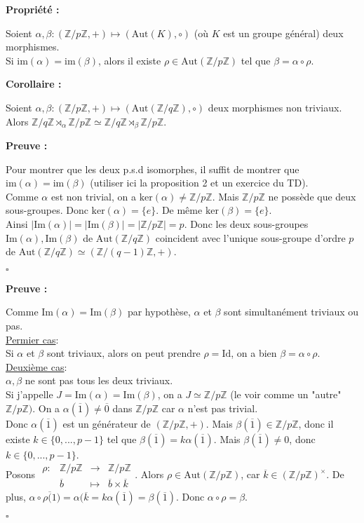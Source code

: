 \documentclass{report}
\renewenvironment{leftbar}{%
  \def\FrameCommand{\vrule width 0.4pt \hspace{10pt}}%
  \MakeFramed {\advance\hsize-\width \FrameRestore}}%
 {\endMakeFramed}%
\newenvironment{preuve}{\vspace*{0.5cm}
    \begin{leftbar}
    \noindent\textbf{Preuve :}\par}{
    \begin{flushright}
    $\square$
    \end{flushright}
    \end{leftbar}
}
\newenvironment{prop}{\begin{tcolorbox}[colframe= white]
    \textbf{Propriété :}
     \par}
    {\end{tcolorbox}}
\newenvironment{corollaire}{\begin{tcolorbox}[colframe= white]
    \textbf{Corollaire :} \par}
    {\end{tcolorbox}}
\newcommand{\im}[0]{\textrm{Im}}
\newcommand{\fonction}[5]{
    \begin{array}{l|rcl}
    #1: & #2 & \longrightarrow & #3 \\
        & #4 & \longmapsto & #5 
    \end{array}
}
\newcommand{\Z}{\mathbb{Z}}
\begin{document}
\begin{prop}
    Soient $\alpha,\beta : (\Z/p\Z,+) \mapsto (\mathrm{Aut}(K),\circ)$ (où $K$ est un groupe général) deux morphismes.\\
    Si $\mathrm{im}(\alpha) = \mathrm{im}(\beta)$, alors il existe $\rho\in\mathrm{Aut}(\Z/p\Z)$ tel que $\beta = \alpha\circ\rho$.
\end{prop}

\begin{corollaire}
    Soient $\alpha,\beta : (\Z/p\Z,+) \mapsto (\mathrm{Aut}(\Z/q\Z),\circ)$ deux morphismes non triviaux. \\
    Alors $\Z/q\Z \rtimes_\alpha \Z/p\Z \simeq \Z/q\Z \rtimes_\beta \Z/p\Z$.
\end{corollaire}

\begin{preuve}
    Pour montrer que les deux p.s.d isomorphes, il suffit de montrer que $\mathrm{im}(\alpha) = \mathrm{im}(\beta)$ (utiliser ici la proposition 2 et un exercice du TD).\\
    Comme $\alpha$ est non trivial, on a $\mathrm{ker}(\alpha) \neq \Z/p\Z$. Mais $\Z/p\Z$ ne possède que deux sous-groupes. Donc $\mathrm{ker}(\alpha) = \{e\}$. De même $\mathrm{ker}(\beta) = \{e\}$.\\
    Ainsi $|\im(\alpha)| = |\im(\beta)| = |\Z/p\Z| = p$. Donc les deux sous-groupes $\im(\alpha),\im(\beta)$ de $\mathrm{Aut}(\Z/q\Z)$ coincident avec l'unique sous-groupe d'ordre $p$ de $\mathrm{Aut}(\Z/q\Z) \simeq (\Z/(q-1)\Z,+)$.
\end{preuve}

\begin{preuve}
    Comme $\im(\alpha) = \im(\beta)$ par hypothèse, $\alpha$ et $\beta$ sont simultanément triviaux ou pas.\\
    \underline{Permier cas}:\\
    Si $\alpha$ et $\beta$ sont triviaux, alors on peut prendre $\rho = \mathrm{Id}$, on a bien $\beta = \alpha \circ \rho$.\\
    \underline{Deuxième cas}:\\
    $\alpha,\beta$ ne sont pas tous les deux triviaux.\\
    Si j'appelle $J = \im(\alpha) = \im(\beta)$, on a $J \simeq \Z/p\Z$ (le voir comme un "autre" $\Z/p\Z)$. On a $\alpha(\overline{1}) \neq \overline{0}$ dans $\Z/p\Z$ car $\alpha$ n'est pas trivial.\\
    Donc $\alpha(\overline{1})$ est un générateur de $(\Z/p\Z,+)$. Mais $\beta(\overline{1})\in \Z/p\Z$, donc il existe $k\in\{0,...,p-1\}$ tel que $\beta(\overline{1}) = k\alpha(\overline
    {1})$. Mais $\beta(\overline{1}) \neq 0$, donc $k\in\{0,...,p-1\}$.\\
    Posons $\fonction{\rho}{\Z/p\Z}{\Z/p\Z}{\overline{b}}{\overline{b}\times\overline{k}}$. Alors $\rho\in\mathrm{Aut}(\Z/p\Z)$, car $\overline{k}\in(\Z/p\Z)^{\times}$. De plus, $\alpha\circ\rho{\overline(1)} = \alpha(\overline{k} = k\alpha(\overline{1}) = \beta(\overline{1})$. Donc $\alpha\circ\rho = \beta$.
\end{preuve}
\end{document}
